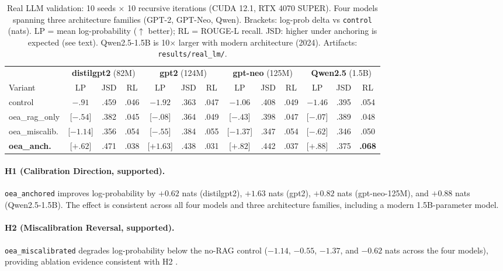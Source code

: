 \documentclass[11pt]{article}
\begin{document}
\begin{table}[h]
\centering
\small
\begin{tabular}{lcccccccccccc}
\toprule
 & \multicolumn{3}{c}{\textbf{distilgpt2} (82M)} & \multicolumn{3}{c}{\textbf{gpt2} (124M)} & \multicolumn{3}{c}{\textbf{gpt-neo} (125M)} & \multicolumn{3}{c}{\textbf{Qwen2.5} (1.5B)} \\
\cmidrule(lr){2-4}\cmidrule(lr){5-7}\cmidrule(lr){8-10}\cmidrule(lr){11-13}
Variant & LP & JSD & RL & LP & JSD & RL & LP & JSD & RL & LP & JSD & RL \\
\midrule
control            & $-.91$ & .459 & .046 & $-1.92$ & .363 & .047 & $-1.06$ & .408 & .049 & $-1.46$ & .395 & .054 \\
oea\_rag\_only      & [$-.54$] & .382 & .045 & [$-.08$] & .364 & .049 & [$-.43$] & .398 & .047 & [$-.07$] & .389 & .048 \\
oea\_miscalib.     & [$-1.14$] & .356 & .054 & [$-.55$] & .384 & .055 & [$-1.37$] & .347 & .054 & [$-.62$] & .346 & .050 \\
\textbf{oea\_anch.} & [$\mathbf{+.62}$] & .471 & .038 & [$\mathbf{+1.63}$] & .438 & .031 & [$\mathbf{+.82}$] & .442 & .037 & [$\mathbf{+.88}$] & .375 & \textbf{.068} \\
\bottomrule
\end{tabular}
\caption{Real LLM validation: 10 seeds $\times$ 10 recursive iterations (CUDA 12.1, RTX 4070 SUPER). Four models spanning three architecture families (GPT-2, GPT-Neo, Qwen). Brackets: log-prob delta vs \texttt{control} (nats). LP = mean log-probability ($\uparrow$ better); RL = ROUGE-L recall. JSD: higher under anchoring is expected (see text). Qwen2.5-1.5B is 10$\times$ larger with modern architecture (2024). Artifacts: \texttt{results/real\_lm/}.}
\label{tab:real-lm}
\end{table}

\paragraph{H1 (Calibration Direction, supported).}
\texttt{oea\_anchored} improves log-probability by $+0.62$ nats (distilgpt2), $+1.63$ nats (gpt2), $+0.82$ nats (gpt-neo-125M), and $+0.88$ nats (Qwen2.5-1.5B). The effect is consistent across all four models and three architecture families, including a modern 1.5B-parameter model.

\paragraph{H2 (Miscalibration Reversal, supported).}
\texttt{oea\_miscalibrated} degrades log-probability below the no-RAG control ($-1.14$, $-0.55$, $-1.37$, and $-0.62$ nats across the four models), providing ablation evidence consistent with H2 \cite{fu2025selfverification,abbasiyadkori2024believe}.
\end{document}
